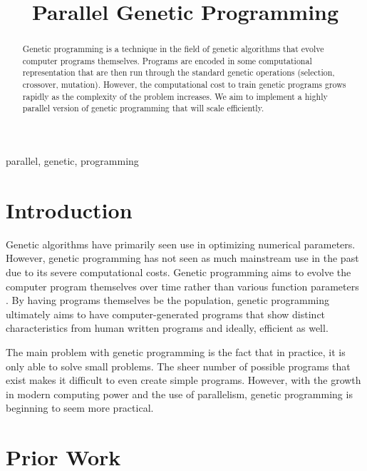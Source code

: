 \documentclass[12pt,conference]{IEEEtran}
\begin{document}
	
	\title{Parallel Genetic Programming
	}
	
	\author{

		\and

	}
	
	\maketitle
	
	\begin{abstract}
Genetic programming is a technique in the field of genetic algorithms that evolve computer programs themselves. Programs are encoded in some computational representation that are then run through the standard genetic operations (selection, crossover, mutation). However, the computational cost to train genetic programs grows rapidly as the complexity of the problem increases. We aim to implement a highly parallel version of genetic programming that will scale efficiently.
	\end{abstract}
	
	\begin{IEEEkeywords}
		parallel, genetic, programming
	\end{IEEEkeywords}
	
	\section{Introduction}
	Genetic algorithms have primarily seen use in optimizing numerical parameters. However, genetic programming has not seen as much mainstream use in the past due to its severe computational costs. Genetic programming aims to evolve the computer program themselves over time rather than various function parameters \cite{b1}. By having programs themselves be the population, genetic programming ultimately aims to have computer-generated programs that show distinct characteristics from human written programs and ideally, efficient as well.
	
	The main problem with genetic programming is the fact that in practice, it is only able to solve small problems. The sheer number of possible programs that exist makes it difficult to even create simple programs. However, with the growth in modern computing power and the use of parallelism, genetic programming is beginning to seem more practical.
	
	\section{Prior Work}
	
\end{document}

